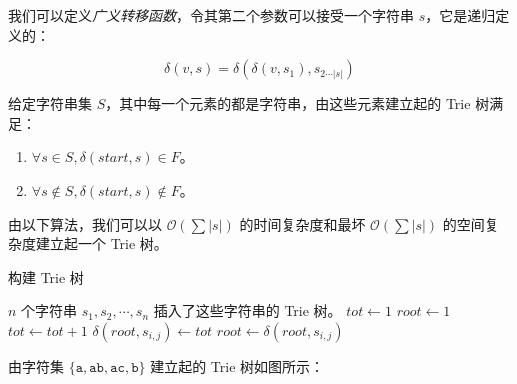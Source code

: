 \documentclass[12pt]{article} %
\begin{document}
我们可以定义\textsl{广义转移函数}，令其第二个参数可以接受一个字符串 $s$，它是递归定义的：

$$\delta(v,s)=\delta(\delta(v,s_1),s_{2 \cdots |s|})$$

\newpage 

给定字符串集 $S$，其中每一个元素的都是字符串，由这些元素建立起的 Trie 树满足：

\begin{enumerate}
    \item $\forall s \in S, \delta(start,s) \in F$。
    \item $\forall s \notin S, \delta(start,s) \notin F$。
\end{enumerate}

由以下算法，我们可以以 $\mathcal O(\sum |s|)$ 的时间复杂度和最坏 $\mathcal O(\sum |s|)$ 的空间复杂度建立起一个 Trie 树。

\begin{algorithm}
	\caption{构建 Trie 树}
	\begin{algorithmic}[1]
		\Require $n$ 个字符串 $s_1,s_2,\cdots,s_n$
		\Ensure 插入了这些字符串的 Trie 树。
		\State $tot \gets 1$
			\State $root \gets 1$
					\State $tot \gets tot+1$
					\State $\delta(root,s_{i,j}) \gets tot$
				\EndIf
				\State $root \gets \delta(root,s_{i,j})$
			\EndFor
		\EndFor
		\State {}
		\EndFunction
	\end{algorithmic}
\end{algorithm}

由字符集 $\{\texttt{a},\texttt{ab},\texttt{ac},\texttt{b}\}$ 建立起的 Trie 树如图所示：

\begin{center}
\end{center}
\end{document}
